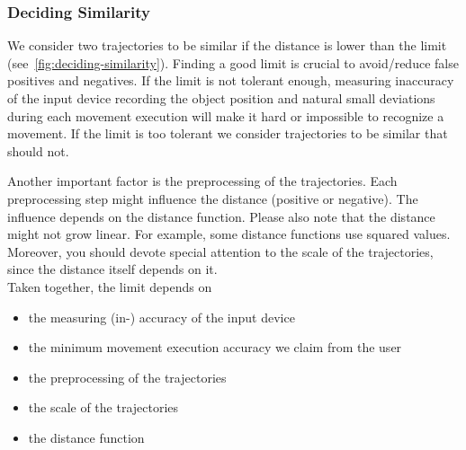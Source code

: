 \subsubsection{Deciding Similarity}\label{subsubsec:deciding-similarity}

We consider two trajectories to be similar if the distance is lower than the limit (see~\autoref{fig:deciding-similarity}).
Finding a good limit is crucial to avoid/reduce false positives and negatives.
If the limit is not tolerant enough, measuring inaccuracy of the input device recording the object position and natural small deviations during each movement execution will make it hard or impossible to recognize a movement.
If the limit is too tolerant we consider trajectories to be similar that should not.

Another important factor is the preprocessing of the trajectories.
Each preprocessing step might influence the distance (positive or negative).
The influence depends on the distance function.
Please also note that the distance might not grow linear.
For example, some distance functions use squared values.
Moreover, you should devote special attention to the scale of the trajectories, since the distance itself depends on it.\\

\noindent
Taken together, the limit depends on

\begin{itemize}
    \item
    the measuring (in-) accuracy of the input device
    \item
    the minimum movement execution accuracy we claim from the user
    \item
    the preprocessing of the trajectories
    \item
    the scale of the trajectories
    \item
    the distance function
\end{itemize}


